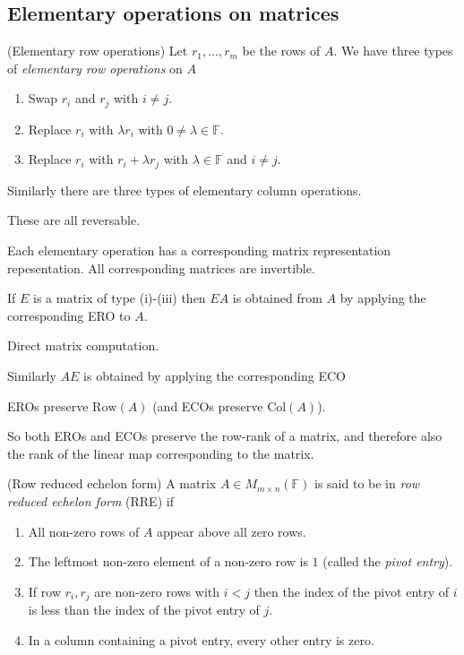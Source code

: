 \documentclass{article}
\newcommand{\F}{\mathbb{F}}
\newcommand{\Col}{\mathrm{Col}}
\newcommand{\Row}{\mathrm{Row}}
\begin{document}
\subsection{Elementary operations on matrices}
\begin{definition}
(Elementary row operations)
Let $ r_1,\dots, r_m $ be the rows of $ A $. We have three types of \textit{elementary row operations} on $ A $
\begin{enumerate}
	\item Swap $ r_i $ and $ r_j $ with $ i\ne j $.
	\item Replace $ r_i $ with $ \lambda r_i $ with $ 0\ne\lambda\in\F $.
	\item Replace $ r_i $ with $ r_i+\lambda r_j $ with $ \lambda\in \F $ and $ i\ne j $.
\end{enumerate}
\end{definition}
Similarly there are three types of elementary column operations.
\begin{remark}
  These are all reversable.
\end{remark}
Each elementary operation has a corresponding matrix representation repesentation. All corresponding matrices are invertible.
\begin{lemma}
  If $ E $ is a matrix of type (i)-(iii) then $ EA $ is obtained from $ A $ by applying the corresponding ERO to $ A $.
\end{lemma}
\pf Direct matrix computation.
\begin{remark}
  Similarly $ AE $ is obtained by applying the corresponding ECO
\end{remark}
\begin{remark}
  EROs preserve $ \Row(A) $ (and ECOs preserve $ \Col(A) $).
\end{remark}
So both EROs and ECOs preserve the row-rank of a matrix, and therefore also the rank of the linear map corresponding to the matrix.
\begin{definition}
	(Row reduced echelon form) A matrix $ A\in M_{m\times n}(\F) $ is said to be in \textit{row reduced echelon form} (RRE) if
	\begin{enumerate}
		\item All non-zero rows of $ A $ appear above all zero rows.
		\item The leftmost non-zero element of a non-zero row is $ 1 $ (called the \textit{pivot entry}).
		\item If row $ r_i,r_j $ are non-zero rows with $ i<j $ then the index of the pivot entry of $ i $ is less than the index of the pivot entry of $ j $.
		\item In a column containing a pivot entry, every other entry is zero.
	\end{enumerate}
\end{definition}
\end{document}
